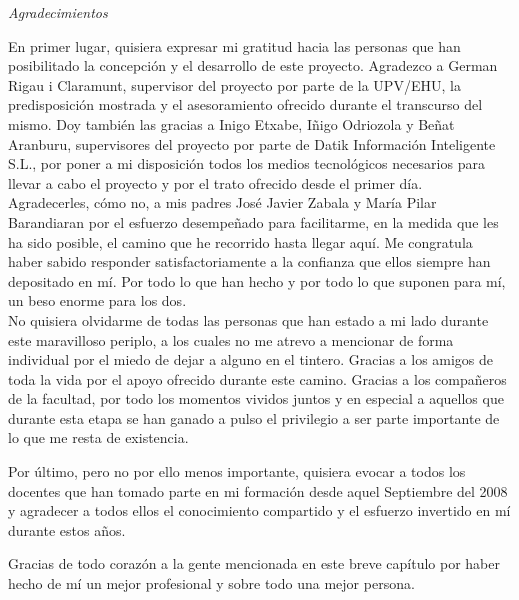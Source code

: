 \begin{flushright}
	\Large\textit{Agradecimientos}
\end{flushright}

En primer lugar, quisiera expresar mi gratitud hacia las personas que han posibilitado la concepción y el desarrollo de este proyecto. Agradezco a German Rigau i Claramunt, supervisor del proyecto por parte de la UPV/EHU, la predisposición mostrada y el asesoramiento ofrecido durante el transcurso del mismo. Doy también las gracias a Inigo Etxabe, Iñigo Odriozola y Beñat Aranburu, supervisores del proyecto por parte de Datik Información Inteligente S.L., por poner a mi disposición todos los medios tecnológicos necesarios para llevar a cabo el proyecto y por el trato ofrecido desde el primer día.\\

Agradecerles, cómo no, a mis padres José Javier Zabala y María Pilar Barandiaran por el esfuerzo desempeñado para facilitarme, en la medida que les ha sido posible, el camino que he recorrido hasta llegar aquí. Me congratula haber sabido responder satisfactoriamente a la confianza que ellos siempre han depositado en mí. Por todo lo que han hecho y por todo lo que suponen para mí, un beso enorme para los dos.\\

No quisiera olvidarme de todas las personas que han estado a mi lado durante este maravilloso periplo, a los cuales no me atrevo a mencionar de forma individual por el miedo de dejar a alguno en el tintero. Gracias a los amigos de toda la vida por el apoyo ofrecido durante este camino. Gracias a los compañeros de la facultad, por todo los momentos vividos juntos y en especial a aquellos que durante esta etapa se han ganado a pulso el privilegio a ser parte importante de lo que me resta de existencia.

Por último, pero no por ello menos importante, quisiera evocar a todos los docentes que han tomado parte en mi formación desde aquel Septiembre del 2008 y agradecer a todos ellos el conocimiento compartido y el esfuerzo invertido en mí durante estos años.

Gracias de todo corazón a la gente mencionada en este breve capítulo por haber hecho de mí un mejor profesional y sobre todo una mejor persona.\\

